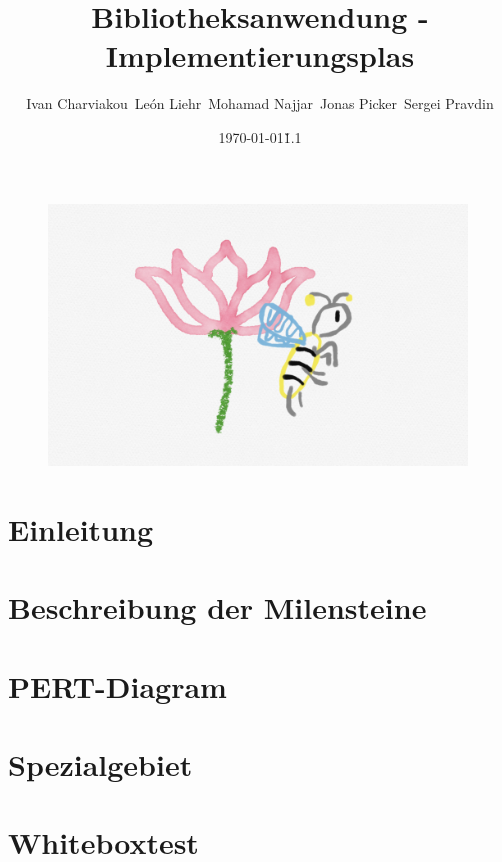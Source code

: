 \documentclass{article}
\title{Bibliotheksanwendung - Implementierungsplas}
\date{\today\v1.1}
\author{
    Ivan Charviakou\
    León Liehr\
    Mohamad Najjar\
    Jonas Picker\
    Sergei Pravdin
}
\begin{document}
    \maketitle
    \begin{figure}[H]
        \centering
        \includegraphics[width = 30em]{Logo}
    \end{figure}
    \newpage
    \tableofcontents
    \newpage


    \section{Einleitung}
    \newpage

    \section{Beschreibung der Milensteine}
    \newpage
    \section{PERT-Diagram}
    \newpage

    \newpage
    \section{Spezialgebiet}
    \newpage

    \section{Whiteboxtest}
    \newpage
\end{document}
